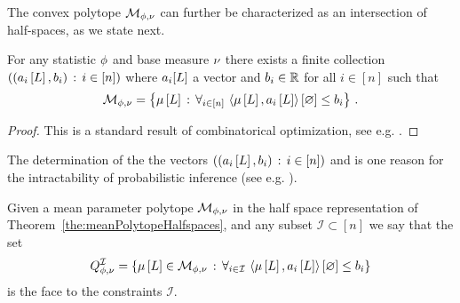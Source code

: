 The convex polytope $\mathcal{M}_{\phi,\nu}$ can further be characterized as an intersection of half-spaces, as we state next.

\begin{theorem}\label{the:meanPolytopeHalfspaces}
	For any statistic $\phi$ and base measure $\nu$ there exists a finite collection $\left( (a_{i}\left[L\right],b_{i}) \, : \, i \in[n]\right)$ where $a_i[L]$ a vector and $b_i\in\mathbb{R}$ for all $i\in[n]$ such that
	\begin{align*}
		\mathcal{M}_{\phi,\nu}
		= \left\{\mu\left[L\right] \, : \, \forall_{i\in[n]} \, \left\langle \mu\left[L\right],a_{i}\left[L\right]\right\rangle \left[ \varnothing \right]\leq b_{i} \right\} \, . 
	\end{align*}
\end{theorem}
\begin{proof}
	This is a standard result of combinatorical optimization, see e.g. \cite{ziegler_lectures_2013}.
\end{proof}

The determination of the the vectors $\left( (a_{i}\left[L\right],b_{i}) \, : \, i \in[n]\right)$ and is one reason for the intractability of probabilistic inference (see e.g. \cite{wainwright_graphical_2008}).



\begin{definition}\label{def:meanPolytopeFaces}
	Given a mean parameter polytope $\mathcal{M}_{\phi,\nu}$ in the half space representation of Theorem~\ref{the:meanPolytopeHalfspaces}, and any subset $\mathcal{I}\subset[n]$ we say that the set
	\begin{align*}
		Q^{\mathcal{I}}_{\phi,\nu} = \left\{\mu\left[L\right]\in\mathcal{M}_{\phi,\nu} \, : \, \forall_{i\in\mathcal{I}} \, \left\langle \mu\left[L\right],a_{i}\left[L\right]\right\rangle \left[ \varnothing \right]\leq b_{i} \right\} 
	\end{align*}
	is the face to the constraints $\mathcal{I}$.
\end{definition}


